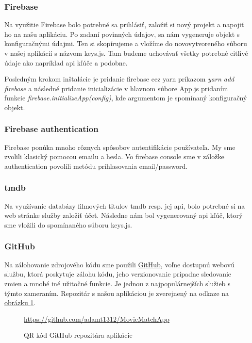 \subsubsection{Firebase}
Na využitie Firebase bolo potrebné sa prihlásiť, založiť si nový projekt a napojiť ho na našu aplikáciu. Po zadaní povinných údajov, sa nám vygeneruje objekt s konfiguračnými údajmi. Ten si skopírujeme a vložíme do novovytvoreného súboru v našej aplikácií s názvom keys.js. Tam budeme uchovávať všetky potrebné citlivé údaje ako napríklad \acrshort{api} kľúče a podobne.

Posledným krokom inštalácie je pridanie firebase cez yarn príkazom \textit{yarn add firebase} a následné pridanie inicializácie v hlavnom súbore App.js pridaním funkcie \textit{firebase.initializeApp(config)}, kde argumentom je spomínaný konfiguračný objekt.
\subsubsection{Firebase authentication}
Firebase ponúka mnoho rôznych spôsobov autentifikácie používateľa. My sme zvolili klasický pomocou emailu a hesla. Vo firebase console sme v záložke authentication povolili metódu prihlasovania email/password. 
\subsubsection{\acrshort{tmdb}}
Na využívanie databázy filmových titulov \acrshort{tmdb} resp. jej \acrshort{api}, bolo potrebné si na web stránke služby založiť účet. Následne nám bol vygenerovaný \acrshort{api} kľúč, ktorý sme vložili do spomínaného súboru keys.js. 
\subsubsection{GitHub}
Na zálohovanie zdrojového kódu sme použili \href{https://github.com/}{GitHub}, voľne dostupnú webovú službu, ktorá poskytuje zálohu kódu, jeho verzionovanie prípadne sledovanie zmien a mnohé iné užitočné funkcie. Je jednou z najpopulárnejších služieb s týmto zameraním. Repozitár s našou aplikáciou je zverejnený na odkaze na \hyperref[ghqrcode]{obrázku \ref{ghqrcode}}. 

\begin{figure}[hbt!]
  \centering   
  \def\stackalignment{c}
           {\scriptsize%
            \url{https://github.com/adamt1312/MovieMatchApp}}
	\caption{QR kód GitHub repozitára aplikácie}  
  \label{ghqrcode}
\end{figure}
